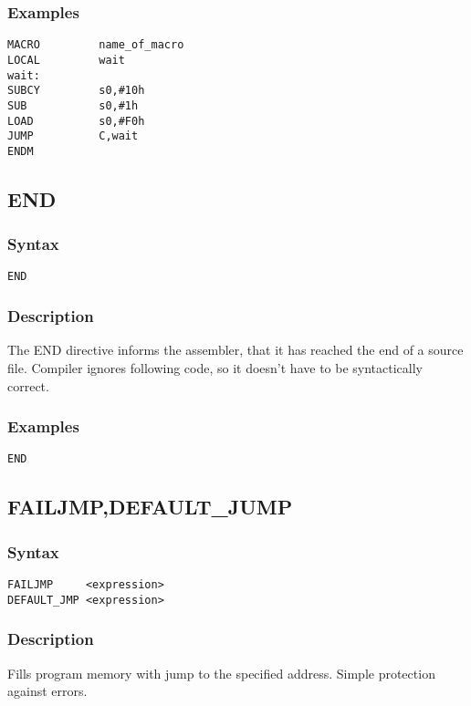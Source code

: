         \subsubsection{Examples}
            \verb'MACRO         name_of_macro'\\
            \verb'LOCAL         wait'\\
            \verb'wait:'\\
            \verb'SUBCY         s0,#10h'\\
            \verb'SUB           s0,#1h' \\
            \verb'LOAD          s0,#F0h'\\
            \verb'JUMP          C,wait'\\
            \verb'ENDM'

    \subsection{END}
        \subsubsection{Syntax}
            \verb'END'

        \subsubsection{Description}
            The END directive informs the assembler, that it has reached the end of a source file. Compiler ignores following code, so it doesn't have to be syntactically correct.

        \subsubsection{Examples}
                \verb'END'

    \subsection{FAILJMP,DEFAULT\_JUMP}
        \subsubsection{Syntax}
            \verb'FAILJMP     <expression>'\\
            \verb'DEFAULT_JMP <expression>'

        \subsubsection{Description}
            Fills program memory with jump to the specified address. Simple protection against errors.

